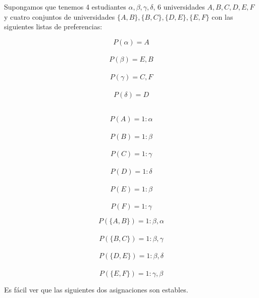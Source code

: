 \begin{eje} \cite{Todo}
Supongamos que tenemos 4 estudiantes $\alpha,\beta,\gamma,\delta$, 6 universidades $A,B,C,D,E,F$ y cuatro conjuntos de universidades $\{A,B\},\{B,C\},\{D,E\},\{E,F\}$ con las siguientes listas de preferencias:
\noindent \begin{minipage}{.3\linewidth}
$$P(\alpha)=A$$ \\
$$P(\beta)=E,B$$ \\
$$P(\gamma)=C,F$$ \\
$$P(\delta)=D$$ \\
\end{minipage}%
\begin{minipage}{.3\linewidth}
$$P(A)=1:\alpha$$ \\
$$P(B)=1:\beta$$ \\
$$P(C)=1: \gamma$$ \\
$$P(D)=1: \delta$$ \\
$$P(E)=1: \beta$$ \\
$$P(F)=1: \gamma$$ 
\end{minipage}
\begin{minipage}{.4\linewidth}
$$P(\{A,B\})= 1:\beta,\alpha$$ \\
$$P(\{B,C\})=1:\beta,\gamma$$ \\
$$P(\{D,E\})= 1:\beta,\delta$$ \\
$$P(\{E,F\})=1:\gamma,\beta$$
\end{minipage}
\medskip

Es fácil ver que las siguientes dos asignaciones son estables.\\

\begin{figure}[H]
\begin{minipage}{.5\linewidth}
\begin{figure}[H]\centering

\end{figure}
\end{minipage}
\end{figure}
\end{eje}
